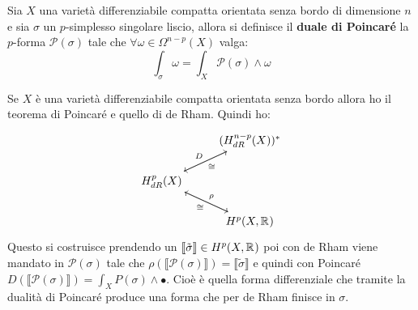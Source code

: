 \begin{definition}
  Sia $ X $ una varietà differenziabile compatta orientata senza bordo di
  dimensione $ n $ e sia $ \sigma $ un $ p $-simplesso singolare liscio, allora si
  definisce il \textbf{duale di Poincaré} la
  $ p $-forma $ \mathcal{P}(\sigma) $ tale che $ \forall \omega \in \Omega^{n-p}(X) $ valga:
  \[
    \int_\sigma \omega = \int_X \mathcal{P}(\sigma) \wedge \omega
  \]

\end{definition}
Se $ X $ è una varietà differenziabile compatta orientata senza bordo
allora ho il teorema di Poincaré e quello di de Rham. Quindi ho:
\[
  \begin{tikzcd}
    {} & (H^{n-p}_{dR}(X))^* \arrow{dl}{\cong} \\
    H^p_{dR}(X) \arrow{ur}{D} \arrow{dr}{\rho} & {} \\
    {} & H^p(X, \RN{}) \arrow{ul}{\cong}
  \end{tikzcd}
\]
Questo si costruisce prendendo un $ \llbracket \tilde{\sigma} \rrbracket \in H^p(X, \mathbb{R}^{}) $ poi
con de Rham viene mandato in $  \mathcal{P}(\sigma)  $ tale che $ \rho(\llbracket\mathcal{P}(\sigma) \rrbracket) = \llbracket\tilde{\sigma}\rrbracket $
e quindi con Poincaré $ D(\llbracket\mathcal{P}(\sigma) \rrbracket) = \int_X P(\sigma) \wedge \bullet $.
Cioè è quella forma differenziale che tramite la dualità di Poincaré
produce una forma che per de Rham finisce in $ \sigma $.


